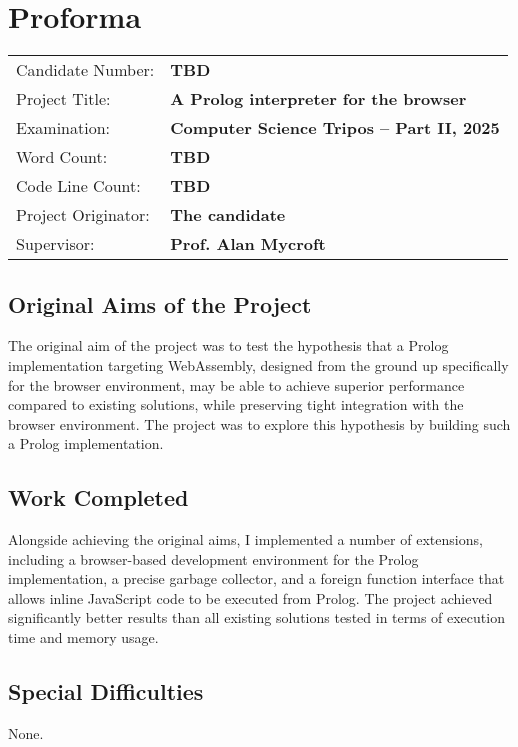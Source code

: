 \chapter*{Proforma}

{\large \begin{tabular}{ll}
Candidate Number: & {\bf TBD} \\
Project Title: & {\bf A Prolog interpreter for the browser} \\
Examination: & {\bf Computer Science Tripos -- Part II, 2025} \\
Word Count: & {\bf TBD} \\
Code Line Count: & {\bf TBD} \\
Project Originator: & {\bf The candidate} \\
Supervisor: & {\bf Prof. Alan Mycroft}
\end{tabular}}

\section*{Original Aims of the Project}

The original aim of the project was to test the hypothesis that a Prolog implementation targeting WebAssembly, designed from the ground up specifically for the browser environment, may be able to achieve superior performance compared to existing solutions, while preserving tight integration with the browser environment. The project was to explore this hypothesis by building such a Prolog implementation.

\section*{Work Completed}

Alongside achieving the original aims, I implemented a number of extensions, including a browser-based development environment for the Prolog implementation, a precise garbage collector, and a foreign function interface that allows inline JavaScript code to be executed from Prolog. The project achieved significantly better results than all existing solutions tested in terms of execution time and memory usage.

\section*{Special Difficulties}

None.